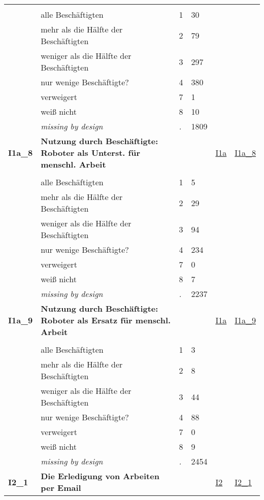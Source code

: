 \begin{longtable}{| L{2.45cm} | L{6cm} | C{1.5cm} | R{1cm} | C{2.25cm} | C{2.25cm} |}
   &  &  &  &  &  \\ 
   & alle Beschäftigten & 1 & 30 &  &  \\ 
   & mehr als die Hälfte der Beschäftigten & 2 & 79 &  &  \\ 
   & weniger als die Hälfte der Beschäftigten & 3 & 297 &  &  \\ 
   & nur wenige Beschäftigte? & 4 & 380 &  &  \\ 
   & verweigert & 7 & 1 &  &  \\ 
   & weiß nicht & 8 & 10 &  &  \\ 
   & \textit{missing by design} & \textit{.} & 1809 &  &  \\ 
   \midrule
\textbf{I1a\_8}\label{var:I1a:8} & \textbf{Nutzung durch Beschäftigte: Roboter als Unterst. für menschl. Arbeit} &  &  & \hyperref[I1a]{I1a} & \hyperref[var:suf:I1a:8]{I1a\_8} \\ 
   &  &  &  &  &  \\ 
   & alle Beschäftigten & 1 & 5 &  &  \\ 
   & mehr als die Hälfte der Beschäftigten & 2 & 29 &  &  \\ 
   & weniger als die Hälfte der Beschäftigten & 3 & 94 &  &  \\ 
   & nur wenige Beschäftigte? & 4 & 234 &  &  \\ 
   & verweigert & 7 & 0 &  &  \\ 
   & weiß nicht & 8 & 7 &  &  \\ 
   & \textit{missing by design} & \textit{.} & 2237 &  &  \\ 
   \midrule
\textbf{I1a\_9}\label{var:I1a:9} & \textbf{Nutzung durch Beschäftigte: Roboter als Ersatz für menschl. Arbeit} &  &  & \hyperref[I1a]{I1a} & \hyperref[var:suf:I1a:9]{I1a\_9} \\ 
   &  &  &  &  &  \\ 
   & alle Beschäftigten & 1 & 3 &  &  \\ 
   & mehr als die Hälfte der Beschäftigten & 2 & 8 &  &  \\ 
   & weniger als die Hälfte der Beschäftigten & 3 & 44 &  &  \\ 
   & nur wenige Beschäftigte? & 4 & 88 &  &  \\ 
   & verweigert & 7 & 0 &  &  \\ 
   & weiß nicht & 8 & 9 &  &  \\ 
   & \textit{missing by design} & \textit{.} & 2454 &  &  \\ 
   \midrule
\textbf{I2\_1}\label{var:I2:1} & \textbf{Die Erledigung von Arbeiten per Email} &  &  & \hyperref[I2]{I2} & \hyperref[var:suf:I2:1]{I2\_1} \\ 

\end{longtable}
